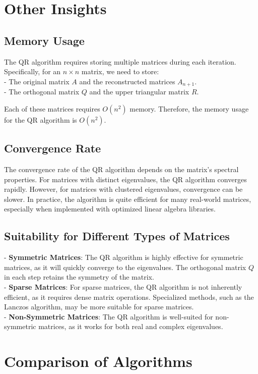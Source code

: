 \documentclass{article}
\begin{document}
\section{Other Insights}

\subsection{Memory Usage}
The QR algorithm requires storing multiple matrices during each iteration. Specifically, for an \( n \times n \) matrix, we need to store:\\
- The original matrix \( A \) and the reconstructed matrices \( A_{n+1} \).\\
- The orthogonal matrix \( Q \) and the upper triangular matrix \( R \).

Each of these matrices requires \( O(n^2) \) memory. Therefore, the memory usage for the QR algorithm is \( O(n^2) \).

\subsection{Convergence Rate}
The convergence rate of the QR algorithm depends on the matrix's spectral properties. For matrices with distinct eigenvalues, the QR algorithm converges rapidly. However, for matrices with clustered eigenvalues, convergence can be slower. In practice, the algorithm is quite efficient for many real-world matrices, especially when implemented with optimized linear algebra libraries.

\subsection{Suitability for Different Types of Matrices}
- \textbf{Symmetric Matrices}: The QR algorithm is highly effective for symmetric matrices, as it will quickly converge to the eigenvalues. The orthogonal matrix \( Q \) in each step retains the symmetry of the matrix.\\
- \textbf{Sparse Matrices}: For sparse matrices, the QR algorithm is not inherently efficient, as it requires dense matrix operations. Specialized methods, such as the Lanczos algorithm, may be more suitable for sparse matrices.\\
- \textbf{Non-Symmetric Matrices}: The QR algorithm is well-suited for non-symmetric matrices, as it works for both real and complex eigenvalues.

\section{Comparison of Algorithms}
\end{document}
